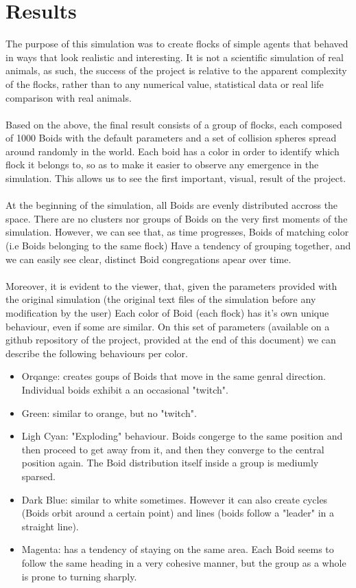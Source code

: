 \documentclass[12pt]{article}
\begin{document}
\section{Results}
The purpose of this simulation was to create flocks of simple agents that behaved in ways that look realistic and interesting. It is not a scientific simulation of real animals, as such, the success of the project is relative to the apparent complexity of the flocks, rather than to any numerical value, statistical data or real life comparison with real animals. 
\\ \\
Based on the above, the final result consists of a group of flocks, each composed of 1000 Boids with the default parameters and a set of collision spheres spread around randomly in the world.
Each boid has a color in order to identify which flock it belongs to, so as to make it easier to observe any emergence in the simulation. This allows us to see the first important, visual, result  of the project. 
\\ \\
At the beginning of the simulation, all Boids are evenly distributed accross the space. There are no clusters nor groups of Boids on the very first moments of the simulation. However, we can see that, as time progresses, Boids of matching color (i.e Boids belonging to the same flock) Have a tendency of grouping together, and we can easily see clear, distinct Boid congregations apear over time. 
\\ \\
Moreover, it is evident to the viewer, that, given the parameters provided with the original simulation (the original text files of the simulation before any modification by the user) Each color of Boid (each flock) has it's own unique behaviour, even if some are similar. On this set of parameters (available on a github repository of the project, provided at the end of this document) we can describe the following behaviours per color.
\begin{itemize}
	\item Orqange: creates goups of Boids that move in the same genral direction. Individual boids exhibit a an occasional "twitch".
	
	\item Green: similar to orange, but no "twitch".
	
	\item Ligh Cyan: "Exploding" behaviour. Boids congerge to the same position and then proceed to get away from it, and then they converge to the central position again. The Boid distribution itself inside a group is mediumly sparsed.
	
	\item Dark Blue: similar to white sometimes. However it can also create cycles (Boids orbit around a certain point) and lines (boids follow a "leader" in a straight line).
	
	\item Magenta: has a tendency of staying on the same area. Each Boid seems to follow the same heading in a very cohesive manner, but the group as a whole is prone to turning sharply.
\end{itemize}
\end{document}
